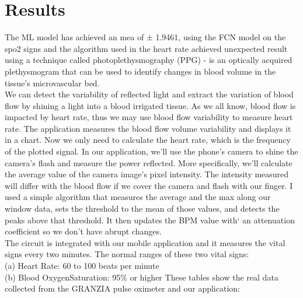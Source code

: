 \documentclass{bmcart}
\begin{document}
\section*{Results}
The ML model has achieved an mea of ± 1.9461, using the FCN model on the spo2
signs and the algorithm used in the heart rate achieved unexpected result using
a technique called photoplethysmography (PPG) - is an optically acquired
plethysmogram that can be used to identify changes in blood volume in the
tissue's microvascular bed.\\
We can detect the variability of reflected light and extract the variation of
blood flow by shining a light into a blood irrigated tissue. As we all know,
blood flow is impacted by heart rate, thus we may use blood flow variability to
measure heart rate. The application measures the blood flow volume variability
and displays it in a chart. Now we only need to calculate the heart rate, which
is the frequency of the plotted signal. In our application, we'll use the
phone's camera to shine the camera's flash and measure the power reflected. More
specifically, we'll calculate the average value of the camera image's pixel
intensity. The intensity measured will differ with the blood flow if we cover
the camera and flash with our finger. I used a simple algorithm that measures
the average and the max along our window data, sets the threshold to the mean of
those values, and detects the peaks above that threshold. It then updates the
BPM value with` an attenuation coefficient so we don't have abrupt changes.\\
The circuit is integrated with our mobile application and it measures the vital
signs every two minutes. The normal ranges of these two vital signs: \\(a) Heart
Rate: 60 to 100 beats per minute \cite{signs} \\(b) Blood OxygenSaturation: 95\%
or higher \cite{olvl} These tables show the real data collected from the GRANZIA
pulse oximeter and our application:
\end{document}
